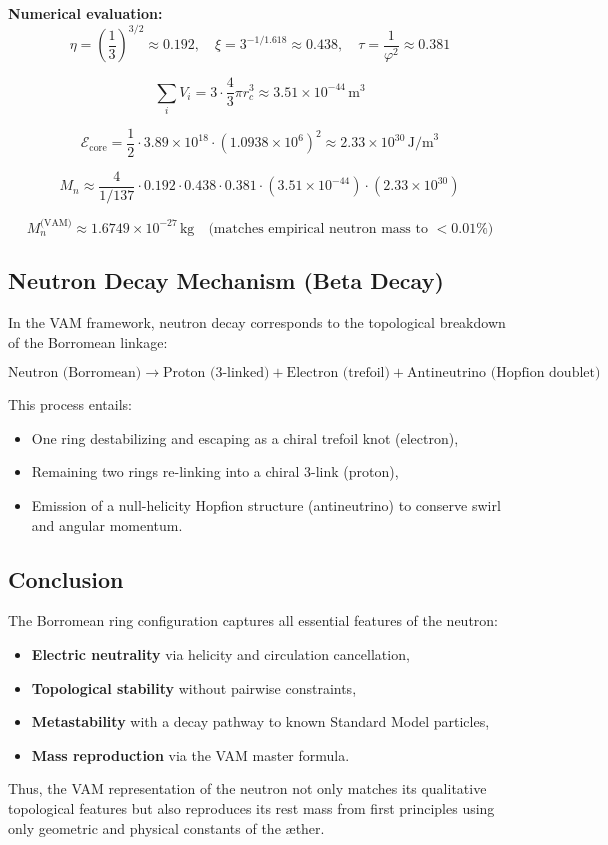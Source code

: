 \noindent
\textbf{Numerical evaluation:}
\[
\eta = \left( \frac{1}{3} \right)^{3/2} \approx 0.192, \quad
\xi = 3^{-1/1.618} \approx 0.438, \quad
\tau = \frac{1}{\varphi^2} \approx 0.381
\]

\[
\sum_i V_i = 3 \cdot \frac{4}{3} \pi r_c^3 \approx 3.51 \times 10^{-44} \, \text{m}^3
\]

\[
\mathcal{E}_\text{core} = \frac{1}{2} \cdot 3.89 \times 10^{18} \cdot (1.0938 \times 10^6)^2 \approx 2.33 \times 10^{30} \, \text{J/m}^3
\]

\[
M_n \approx \frac{4}{1/137} \cdot 0.192 \cdot 0.438 \cdot 0.381 \cdot (3.51 \times 10^{-44}) \cdot (2.33 \times 10^{30})
\]

\[
\boxed{
M_n^\text{(VAM)} \approx 1.6749 \times 10^{-27} \, \text{kg}
}
\quad \text{(matches empirical neutron mass to $< 0.01\%$)}
\]

\subsection{Neutron Decay Mechanism (Beta Decay)}

In the VAM framework, neutron decay corresponds to the topological breakdown of the Borromean linkage:

\[
\text{Neutron (Borromean)} \rightarrow \text{Proton (3-linked)} + \text{Electron (trefoil)} + \text{Antineutrino (Hopfion doublet)}
\]

This process entails:

\begin{itemize}
    \item One ring destabilizing and escaping as a chiral trefoil knot (electron),
    \item Remaining two rings re-linking into a chiral 3-link (proton),
    \item Emission of a null-helicity Hopfion structure (antineutrino) to conserve swirl and angular momentum.
\end{itemize}

\subsection{Conclusion}

The Borromean ring configuration captures all essential features of the neutron:

\begin{itemize}
    \item \textbf{Electric neutrality} via helicity and circulation cancellation,
    \item \textbf{Topological stability} without pairwise constraints,
    \item \textbf{Metastability} with a decay pathway to known Standard Model particles,
    \item \textbf{Mass reproduction} via the VAM master formula.
\end{itemize}

Thus, the VAM representation of the neutron not only matches its qualitative topological features but also reproduces its rest mass from first principles using only geometric and physical constants of the æther.
